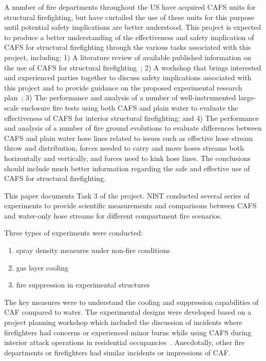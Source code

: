\documentclass[12pt,oneside]{book}
\begin{document}
A number of fire departments throughout the US have acquired CAFS units for structural firefighting, but have curtailed the use of these units for this purpose until potential safety implications are better understood. This project is expected to produce a better understanding of the effectiveness and safety implication of CAFS for structural firefighting through the various tasks associated with this project, including: 1) A literature review of available published information on the use of CAFS for structural firefighting~\cite{Mitchell:1}; 2) A workshop that brings interested and experienced parties together to discuss safety implications associated with this project and to provide guidance on the proposed experimental research plan~\cite{Grant:2011}; 3) The performance and analysis of a number of well-instrumented large-scale enclosure fire tests using both CAFS and plain water to evaluate the effectiveness of CAFS for interior structural firefighting; and 4) The performance and analysis of a number of fire ground evolutions to evaluate differences between CAFS and plain water hose lines related to issues such as effective hose stream throw and distribution, forces needed to carry and move hoses streams both horizontally and vertically, and forces need to kink hose lines. The conclusions should include much better information regarding the safe and effective use of CAFS for structural firefighting.

This paper documents Task 3 of the project. NIST conducted several series of experiments to provide scientific measurements and comparisons between CAFS and water-only hose streams for different compartment fire scenarios.

Three types of experiments were conducted:
\begin{enumerate}
\item spray density measures under non-fire conditions
\item gas layer cooling
\item fire suppression in experimental structures
\end{enumerate}

The key measures were to understand the cooling and suppression capabilities of CAF compared to water. The experimental designs were developed based on a project planning workshop which included the discussion of incidents where firefighters had concerns or experienced minor burns while using CAFS during interior attack operations in residential occupancies~\cite{Grant:2011}. Anecdotally, other fire departments or firefighters had similar incidents or impressions of CAF.
\end{document}

